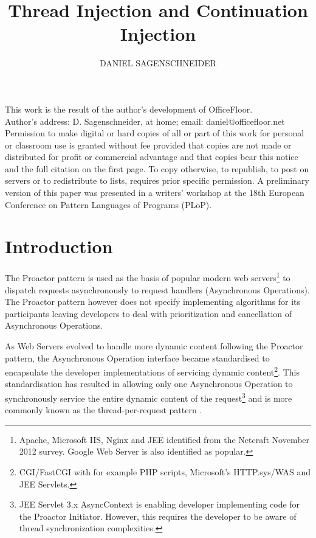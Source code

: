 \documentclass[prodmode]{style/acmlarge}
\title{Thread Injection and Continuation Injection}
\author{DANIEL SAGENSCHNEIDER \affil{daniel@officefloor.net}}
\begin{document}
\begin{bottomstuff}
This work is the result of the author's development of OfficeFloor.\\
Author's address: D. Sagenschneider, at home; email: daniel@officefloor.net\\

Permission to make digital or hard copies of all or part of this work for
personal or classroom use is granted without fee provided that copies are not
made or distributed for profit or commercial advantage and that copies bear this
notice and the full citation on the first page. To copy otherwise, to republish,
to post on servers or to redistribute to lists, requires prior specific
permission. A preliminary version of this paper was presented in a writers'
workshop at the 18th European Conference on Pattern Languages of Programs
(PLoP).
\end{bottomstuff}

\maketitle


\section{Introduction}

The Proactor pattern \cite{proactor} is used as the basis of popular modern web
servers\footnote{Apache, Microsoft IIS, Nginx and JEE identified from the
Netcraft November 2012 survey.  Google Web Server is also identified as
popular.} to dispatch requests asynchronously to request handlers (Asynchronous
Operations).  The Proactor pattern however does not specify implementing
algorithms for its participants leaving developers to deal with prioritization
and cancellation of Asynchronous Operations.

As Web Servers evolved to handle more dynamic content following the Proactor
pattern, the Asynchronous Operation interface became standardised to encapsulate
the developer implementations of servicing dynamic content\footnote{CGI/FastCGI
with for example PHP scripts, Microsoft's HTTP.sys/WAS and JEE Servlets.}.  This
standardisation has resulted in allowing only one Asynchronous Operation to
synchronously service the entire dynamic content of the request\footnote{JEE
Servlet 3.x AsyncContext is enabling developer implementing code for the
Proactor Initiator.  However, this requires the developer to be aware of thread
synchronization complexities.} and is more commonly known as the
thread-per-request pattern \cite{thread-per-request}.
\end{document}
